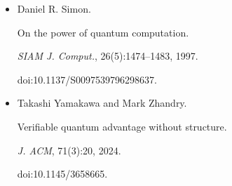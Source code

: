 \documentclass[10pt,a4paper]{article}
\begin{document}
\begin{itemize}
\item[] 
[22]

Daniel R. Simon.


On the power of quantum computation.


\emph{SIAM J. Comput.}, 26(5):1474–1483, 1997.


doi:10.1137/S0097539796298637.





\item[] 
[23]

Takashi Yamakawa and Mark Zhandry.


Verifiable quantum advantage without structure.


\emph{J. ACM}, 71(3):20, 2024.


doi:10.1145/3658665.





\end{itemize}
\end{document}
